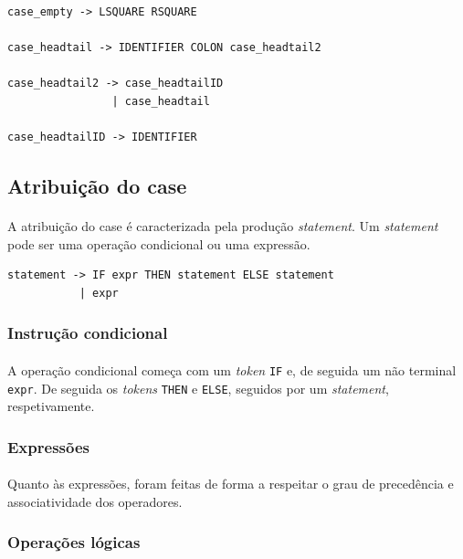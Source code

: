 \documentclass[11pt,a4paper]{report}
\begin{document}
\begin{verbatim}
case_empty -> LSQUARE RSQUARE

case_headtail -> IDENTIFIER COLON case_headtail2

case_headtail2 -> case_headtailID
                | case_headtail

case_headtailID -> IDENTIFIER
\end{verbatim}

\subsection{Atribuição do case}
\paragraph*{}
A atribuição do case é caracterizada pela produção \textit{statement}. Um \textit{statement} pode ser uma operação condicional ou uma expressão.

\begin{verbatim}
statement -> IF expr THEN statement ELSE statement
           | expr
\end{verbatim}

\subsubsection{Instrução condicional}
\paragraph*{}
A operação condicional começa com um \textit{token} \texttt{IF} e, de seguida um não terminal \texttt{expr}. De seguida os \textit{tokens} \texttt{THEN} e \texttt{ELSE}, seguidos por um \textit{statement}, respetivamente.

\subsubsection{Expressões}
\paragraph*{}
Quanto às expressões, foram feitas de forma a respeitar o grau de precedência e associatividade dos operadores.


\subsubsection{Operações lógicas}
\end{document}
